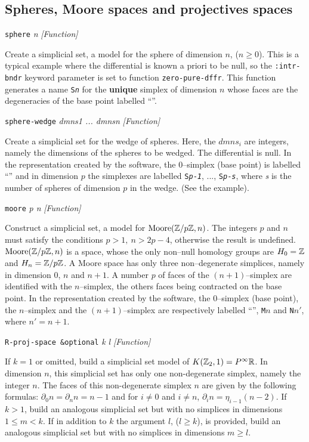\subsection {Spheres, Moore spaces and projectives spaces}
{\parindent=0mm
{\leftskip=5mm
{\tt sphere} {\em n} \hfill {\em [Function]} \par}
{\leftskip=15mm
Create a simplicial set, a model  for the sphere of dimension $n$, ($n \geq 0$).
This is a typical example where the differential is known a priori to be null, so the {\tt :intr-bndr}
keyword parameter is set to function {\tt zero-pure-dffr}.
This function generates a name {\tt S{\em n}} for the {\bf unique} simplex of dimension $n$
whose faces are the degeneracies of the base point labelled ``{\tt *}''.  \par}
{\leftskip=5mm
{\tt sphere-wedge} {\em dmns1 ... dmnsn} \hfill {\em [Function]} \par}
{\leftskip=15mm
Create a simplicial set for the wedge of spheres. Here, the $dmns_i$ are integers,
namely the dimensions of the spheres to be wedged. The differential is null.
In the  representation created by the software, the $0$--simplex (base point) is labelled
``{\tt *}'' and in dimension $p$ the simplexes are labelled {\tt S{\em p}-{\em 1}}, ...,
{\tt S{\em p}-{\em s}},  where
{\em s} is the number of spheres of dimension $p$ in the wedge. (See the example). \par}
{\leftskip=5mm
{\tt moore} {\em  p n} \hfill {\em [Function]}\par}
{\leftskip=15mm
Construct a simplicial set, a model for  ${\rm Moore}({\mathbb{Z}}/{p{\mathbb{Z}}},n)$.
The integers $p$ and $n$ must satisfy  the conditions $p>1,\ n> 2p-4$, otherwise
the result is undefined.
${\rm Moore}({\mathbb{Z}}/{p{\mathbb{Z}}},n)$ is a space, whose the only non--null homology groups are $H_0={\mathbb{Z}}$
and $H_n={\mathbb{Z}}/{p{\mathbb{Z}}}$. A Moore space has only three non--degenerate simplices, namely in dimension
$0$, $n$ and $n+1$. A number $p$ of faces of the  $(n+1)$--simplex are identified with the $n$--simplex,
the others faces being contracted on the base point.
In the  representation created by the software, the $0$--simplex (base point),
the $n$--simplex and the $(n+1)$--simplex are respectively labelled
``{\tt *}'', {\tt M{$n$}} and {\tt N{$n'$}}, where $n'=n+1$. \par}
{\leftskip=5mm
{\tt R-proj-space \&optional} {\em k l} \hfill {\em [Function]} \par}
{\leftskip=15mm
If $k=1$ or omitted, build a simplicial set model of $K({\mathbb{Z}}_2,1)= P^\infty {{\mathbb{R}}}$.
In dimension $n$, this simplicial set has only one non-degenerate simplex, namely the integer $n$.
The faces of this non-degenerate simplex $n$ are given by the following formulas:
$\partial_0 n = \partial_n n = n-1$ and for $i \not= 0$ and $i \not=n$,  $\partial_i n= \eta_{i-1} (n-2)$.
If $k >1$, build an
analogous simplicial set but with no simplices in dimensions $1 \leq m < k$. If in addition to $k$
the argument $l$, ($l \geq k$), is provided, build
an analogous simplicial set but with no simplices in dimensions $m \geq l$. \par
}

}
